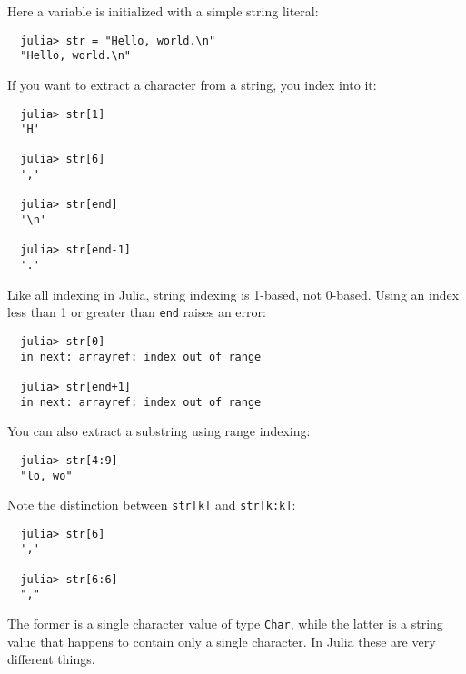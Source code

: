 \documentclass{article}
\begin{document}
Here a variable is initialized with a simple string literal:
\begin{verbatim}
  julia> str = "Hello, world.\n"
  "Hello, world.\n"
\end{verbatim}
If you want to extract a character from a string, you index into it:
\begin{verbatim}
  julia> str[1]
  'H'

  julia> str[6]
  ','

  julia> str[end]
  '\n'

  julia> str[end-1]
  '.'
\end{verbatim}
Like all indexing in Julia, string indexing is 1-based, not 0-based.
Using an index less than 1 or greater than \verb|end| raises an error:
\begin{verbatim}
  julia> str[0]
  in next: arrayref: index out of range

  julia> str[end+1]
  in next: arrayref: index out of range
\end{verbatim}
You can also extract a substring using range indexing:
\begin{verbatim}
  julia> str[4:9]
  "lo, wo"
\end{verbatim}
Note the distinction between \verb|str[k]| and \verb|str[k:k]|:
\begin{verbatim}
  julia> str[6]
  ','

  julia> str[6:6]
  ","
\end{verbatim}
The former is a single character value of type \verb|Char|, while the latter is a string value that happens to contain only a single character.
In Julia these are very different things.
\end{document}
